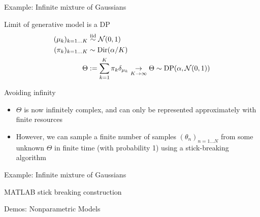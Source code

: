 \begin{frame}{Example: Infinite mixture of Gaussians}
  \begin{block}{Limit of generative model is a DP}
    \begin{align*}
      (\mu_k)_{k=1\ldots K} & \stackrel{\mathrm{iid}}{\sim} \mathcal{N}(0, 1) \\
      (\pi_k)_{k=1\ldots K} & \sim \textrm{Dir}(\alpha/K)  \\
      \Theta & := \sum_{k=1}^K \pi_k \delta_{\mu_k}  \underset{K \to \infty}{\to} \Theta \sim \textrm{DP}(\alpha, \mathcal{N}(0,1))
    \end{align*}
  \end{block}
  \begin{block}{Avoiding infinity}
    \vspace{0.5\baselineskip}
    \begin{itemize}
      \item $\Theta$ is now infinitely complex, and can only be represented approximately with finite resources
      \vspace{0.5\baselineskip}
      \item However, we can sample a finite number of samples $(\theta_n)_{n=1\ldots N}$ from some unknown $\Theta$ in finite time (with probability 1) using a stick-breaking algorithm
    \end{itemize}
  \end{block}
\end{frame}  

\begin{frame}{Example: Infinite mixture of Gaussians}
  \begin{block}{MATLAB stick breaking construction}

  \end{block}
\end{frame}


\begin{frame}{Demos: Nonparametric Models}

\end{frame}


